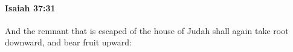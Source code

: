 
		\paragraph{Isaiah 37:31} %
			\label{ISAIAH-37-31}

			And the remnant that is escaped of the house of Judah shall again take root downward, and bear fruit upward:


